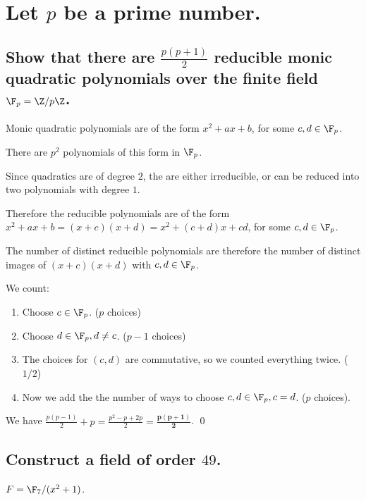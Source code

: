 \section[Problem 6]{
    Let $p$ be a prime number.
}  
    \subsection[(i)]{
        Show that there are $\frac{p(p+1)}{2}$ reducible monic quadratic polynomials over
        the finite field $\F_p = \Z/p\Z$.
    }
        Monic quadratic polynomials are of the form $x^2 + ax + b$, for some $c,d\in \F_p$.

        There are $p^2$ polynomials of this form in $\F_p$.

        Since quadratics are of degree $2$, the are either irreducible,
        or can be reduced into two polynomials with degree $1$.

        Therefore the reducible polynomials are of the form 
        $x^2 + ax + b = (x + c)(x + d) = x^2 + (c+d)x + cd$, for some $c,d \in \F_p$.


        The number of distinct reducible polynomials are therefore the number of distinct
        images of $(x+c)(x+d)$ with $c,d \in \F_p$.

        We count:
        \begin{enumerate}
            \item Choose $c \in \F_p$. ($p$ choices)
            \item Choose $d \in \F_p, d \neq c$. ($p - 1$ choices)
            \item The choices for $(c,d)$ are commutative, so we counted everything twice. ($1/2$)
            \item Now we add the the number of ways to choose $c,d\in \F_p, c= d$. ($p$ choices).
        \end{enumerate}

        We have $\frac{p(p-1)}{2} + p = \frac{p^2 - p + 2p}{2} = \bm{\frac{p(p+1)}{2}}$.
        \qed





    \subsection[(ii)]{
        Construct a field of order $49$.
    }
        $F = \F_7 / (x^2 + 1)$.

